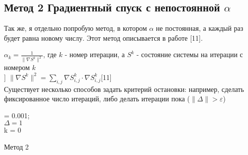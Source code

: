 \documentclass[ 12pt,x11names]{article}
\begin{document}
    \subsection{Метод 2 Градиентный спуск с непостоянной $\alpha$}
    Так же, я  отдельно попробую метод, в котором  $\alpha$ не постоянная, а каждый раз будет равна новому числу. Этот метод описывается в работе [11].\\
    \begin{comment}
     $\alpha_k  = \frac{\| \nabla S^k \|^2}{\| \nabla S^{k-1} \|^2}$,
     \end{comment}
     $\alpha_k  = \frac{1}{\| \nabla S^k \|^2}$, где $k$ - номер итерации, а $S^k$ - состояние системы на итерации с номером $k$\\]
     $\| \nabla S^k \|^2  = \displaystyle{\sum_{i, j}}  \nabla S^k_{i,j} \cdot  \nabla S^k_{i,j}$[11]\\
    Существует несколько способов задать критерий остановки: например, сделать фиксированное число итераций, либо делать итерации пока  ($\| \Delta \|> \varepsilon$)\\
    \begin{comment}
		     $\alpha  = \frac{\| \nabla S^k \|^2}{\| \nabla S^{k-1} \|^2}$\\
    \end{comment}
    \begin{algorithm}[H]
		\SetAlgoLined
		\alpha = 0.001;\\
		$ \Delta  = 1$\\
		k = 0\\
	\caption{Метод 2}
    \end{algorithm}
\end{document}
